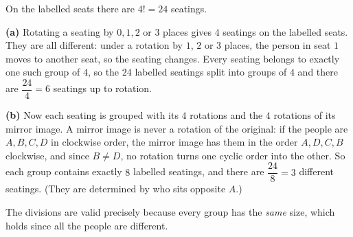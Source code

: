 On the labelled seats there are $4!=24$ seatings.

\textbf{(a)} Rotating a seating by $0,1,2$ or $3$ places gives $4$ seatings on the labelled seats. They are all different: under a rotation by $1$, $2$ or $3$ places, the person in seat $1$ moves to another seat, so the seating changes. Every seating belongs to exactly one such group of $4$, so the $24$ labelled seatings split into groups of $4$ and there are $\dfrac{24}{4}=\boxed{6}$ seatings up to rotation.

\textbf{(b)} Now each seating is grouped with its $4$ rotations and the $4$ rotations of its mirror image. A mirror image is never a rotation of the original: if the people are $A,B,C,D$ in clockwise order, the mirror image has them in the order $A,D,C,B$ clockwise, and since $B\ne D$, no rotation turns one cyclic order into the other. So each group contains exactly $8$ labelled seatings, and there are $\dfrac{24}{8}=\boxed{3}$ different seatings. (They are determined by who sits opposite $A$.)

The divisions are valid precisely because every group has the \emph{same} size, which holds since all the people are different.
